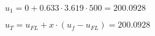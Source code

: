 \( u_1 = 0 + 0.633 \cdot 3.619 \cdot 500 = 200.0928 \)  

\( u_T = u_{FL} + x \cdot (u_f - u_{FL}) = 200.0928 \)